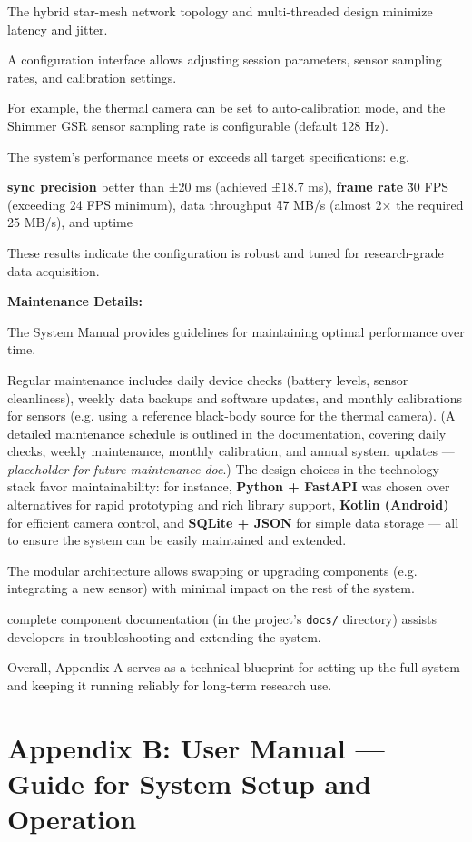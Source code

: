 The hybrid star-mesh network topology and multi-threaded design minimize latency and
jitter.

A configuration interface allows adjusting session parameters, sensor sampling rates,
and calibration settings.

For example, the thermal camera can be set to auto-calibration mode, and the Shimmer
GSR sensor sampling rate is configurable (default 128 Hz).

The system's performance meets or exceeds all target specifications: e.g.

\textbf{sync precision}
 better than ±20 ms (achieved \~±18.7 ms), \textbf{frame rate}
 \~30 FPS (exceeding 24 FPS minimum), data throughput \~47 MB/s (almost 2× the
 required 25 MB/s), and uptime %

These results indicate the configuration is robust and tuned for research-grade data
acquisition.

\textbf{Maintenance Details:}

The System Manual provides guidelines for maintaining optimal performance over time.

Regular maintenance includes daily device checks (battery levels, sensor
cleanliness), weekly data backups and software updates, and monthly calibrations for
sensors (e.g.  using a reference black-body source for the thermal camera).  (A
detailed maintenance schedule is outlined in the documentation, covering daily
checks, weekly maintenance, monthly calibration, and annual system updates ---
\textit{placeholder for future maintenance doc}.) The design choices in the
technology stack favor maintainability: for instance, \textbf{Python + FastAPI}
 was chosen over alternatives for rapid prototyping and rich library support,
 \textbf{Kotlin (Android)}
 for efficient camera control, and \textbf{SQLite + JSON}
 for simple data storage --- all to ensure the system can be easily maintained and
 extended.

The modular architecture allows swapping or upgrading components (e.g.  integrating a
new sensor) with minimal impact on the rest of the system.

complete component documentation (in the project's \texttt{docs/} directory) assists
developers in troubleshooting and extending the system.

Overall, Appendix A serves as a technical blueprint for setting up the full system
and keeping it running reliably for long-term research use.

\section{Appendix B: User Manual --- Guide for System Setup and Operation}

